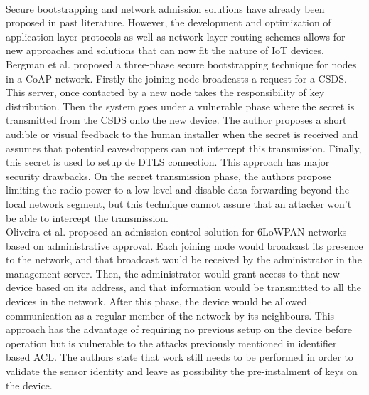 \paragraph{}
Secure bootstrapping and network admission solutions have already been proposed in past literature. However, the development and optimization of application layer protocols as well as network layer routing schemes allows for new approaches and solutions that can now fit the nature of \ac{IoT} devices.
Bergman et al. \cite{Bergmann2012} proposed a three-phase secure bootstrapping technique for nodes in a \ac{CoAP} network. Firstly the joining node broadcasts a request for a \ac{CSDS}. This server, once contacted by a new node takes the responsibility of key distribution. Then the system goes under a vulnerable phase where the secret is transmitted from the \ac{CSDS} onto the new device. The author proposes a short audible or visual feedback to the human installer when the secret is received and assumes that potential eavesdroppers can not intercept this transmission. Finally, this secret is used to setup de \ac{DTLS} connection. This approach has major security drawbacks. On the secret transmission phase, the authors propose limiting the radio power to a low level and disable data forwarding beyond the local network segment, but this technique cannot assure that an attacker won't be able to intercept the transmission.\\
Oliveira et al. \cite{Oliveira2013} proposed an admission control solution for 6LoWPAN networks based on administrative approval. Each joining node would broadcast its presence to the network, and that broadcast would be received by the administrator in the management server. Then, the administrator would grant access to that new device based on its address, and that information would be transmitted to all the devices in the network. After this phase, the device would be allowed communication as a regular member of the network by its neighbours. This approach has the advantage of requiring no previous setup on the device before operation but is vulnerable to the attacks previously mentioned in identifier based \ac{ACL}. The authors state that work still needs to be performed in order to validate the sensor identity and leave as possibility the pre-instalment of keys on the device. 